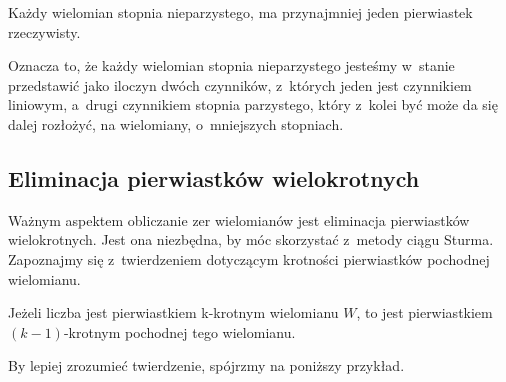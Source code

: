 \begin{theorem}
	$ $\\
	Każdy wielomian stopnia nieparzystego, ma przynajmniej jeden pierwiastek rzeczywisty.
\end{theorem}

Oznacza to, że każdy wielomian stopnia nieparzystego jesteśmy w~stanie przedstawić jako iloczyn dwóch czynników, z~których jeden jest czynnikiem liniowym, a~drugi czynnikiem stopnia parzystego, który z~kolei być może da się dalej rozłożyć, na wielomiany, o~mniejszych stopniach.

\subsection{Eliminacja pierwiastków wielokrotnych}

Ważnym aspektem obliczanie zer wielomianów jest eliminacja pierwiastków wielokrotnych. Jest ona niezbędna, by móc skorzystać z~metody ciągu Sturma. Zapoznajmy się z~twierdzeniem dotyczącym krotności pierwiastków pochodnej wielomianu.

\begin{theorem}
	$ $\\
	Jeżeli liczba jest pierwiastkiem k-krotnym wielomianu $W$, to jest pierwiastkiem $(k-1)$-krotnym pochodnej tego wielomianu.
\end{theorem}

By lepiej zrozumieć twierdzenie, spójrzmy na poniższy przykład.

